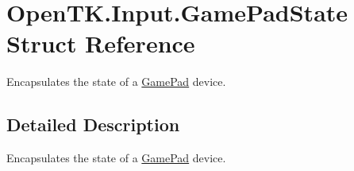 \hypertarget{struct_open_t_k_1_1_input_1_1_game_pad_state}{\section{Open\-T\-K.\-Input.\-Game\-Pad\-State Struct Reference}
\label{struct_open_t_k_1_1_input_1_1_game_pad_state}
}


Encapsulates the state of a \hyperlink{class_open_t_k_1_1_input_1_1_game_pad}{Game\-Pad} device.  




\subsection{Detailed Description}
Encapsulates the state of a \hyperlink{class_open_t_k_1_1_input_1_1_game_pad}{Game\-Pad} device. 

